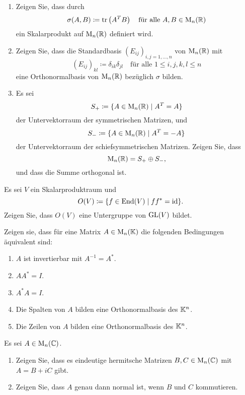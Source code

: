 \documentclass[a4paper,10pt]{scrartcl}
\begin{document}
\begin{question}
  \begin{enumerate}[leftmargin=*]
    \item
      Zeigen Sie, dass durch
      \[
        \sigma(A, B) \coloneqq \operatorname{tr}\left( A^T B \right)
        \quad
        \text{für alle $A, B \in \operatorname{M}_n(\mathbb{R})$}
      \]
      ein Skalarprodukt auf $\operatorname{M}_n(\mathbb{R})$ definiert wird.
    \item
      Zeigen Sie, dass die Standardbasis $(E_{ij})_{i,j=1,\dotsc,n}$ von $\operatorname{M}_n(\mathbb{R})$ mit
      \[
        (E_{ij})_{kl} \coloneqq \delta_{ik} \delta_{jl}
        \quad
        \text{für alle $1 \leq i,j,k,l \leq n$}
      \]
      eine Orthonormalbasis von $\operatorname{M}_n(\mathbb{R})$ bezüglich $\sigma$ bilden.
    \item
      Es sei
      \[
        S_+ \coloneqq \{A \in \operatorname{M}_n(\mathbb{R}) \mid A^T = A\}
      \]
      der Untervektorraum der symmetrischen Matrizen, und
      \[
        S_- \coloneqq \{A \in \operatorname{M}_n(\mathbb{R}) \mid A^T  = -A\}
      \]
      der Untervektorraum der schiefsymmetrischen Matrizen.
      Zeigen Sie, dass
      \[
        \operatorname{M}_n(\mathbb{R}) = S_+ \oplus S_-,
      \]
      und dass die Summe orthogonal ist.
  \end{enumerate}
\end{question}


\begin{question}
  Es sei $V$ ein Skalarproduktraum und
  \[
    O(V) \coloneqq \{ f \in \operatorname{End}(V) \mid f f^* = \operatorname{id} \}.
  \]
  Zeigen Sie, dass $O(V)$ eine Untergruppe von $\operatorname{GL}(V)$ bildet.
\end{question}


\begin{question}
Zeigen sie, dass für eine Matrix $A \in \operatorname{M}_n(\mathbb{K})$ die folgenden Bedingungen äquivalent sind:
  \begin{enumerate}
    \item
      $A$ ist invertierbar mit $A^{-1} = A^*$.
    \item
      $A A^* = I$.
    \item
      $A^* A = I$.
    \item
      Die Spalten von $A$ bilden eine Orthonormalbasis des $\mathbb{K}^n$.
    \item
      Die Zeilen von $A$ bilden eine Orthonormalbasis des $\mathbb{K}^n$.
  \end{enumerate}
\end{question}


\begin{question}
  Es sei $A \in \operatorname{M}_n(\mathbb{C})$.
  \begin{enumerate}[leftmargin=*]
    \item
      Zeigen Sie, dass es eindeutige hermitsche Matrizen $B, C \in \operatorname{M}_n(\mathbb{C})$ mit $A = B + i C$ gibt.
    \item
      Zeigen Sie, dass $A$ genau dann normal ist, wenn $B$ und $C$ kommutieren.
  \end{enumerate}
\end{question}
\end{document}
